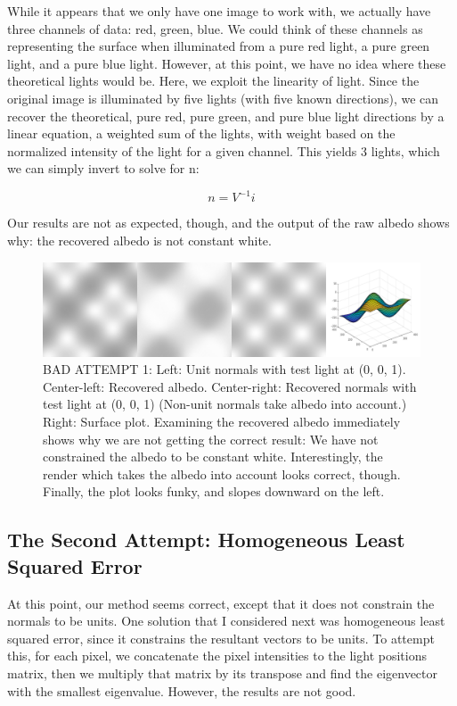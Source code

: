 \documentclass{article}
\begin{document}
While it appears that we only have one image to work with, we actually have 
three channels of data: red, green, blue. We could think of these channels as 
representing the surface when illuminated from a pure red light, a pure green 
light, and a pure blue light. However, at this point, we have no idea where 
these theoretical lights would be. Here, we exploit the linearity of light. 
Since the original image is illuminated by five lights (with five known 
directions), we can recover the theoretical, pure red, pure green, and pure blue 
light directions by a linear equation, a weighted sum of the lights, with 
weight based on the normalized intensity of the light for a given channel. This 
yields 3 lights, which we can simply invert to solve for n:

$$
n = V^{-1} i
$$

Our results are not as expected, though, and the output of the raw albedo shows 
why: the recovered albedo is not constant white.

\begin{figure}[!ht]
	\centering
	\includegraphics[width=160mm]{figs/q2_im2_bad1_all_figs.png}
	\caption{BAD ATTEMPT 1: Left: Unit normals with test light at (0, 0, 1). Center-left: 
        Recovered albedo. Center-right: Recovered normals with test light at (0, 
        0, 1) (Non-unit normals take albedo into account.) Right: Surface plot. 
        Examining the recovered albedo immediately shows why we are not getting 
        the correct result: We have not constrained the albedo to be constant 
        white. Interestingly, the render which takes the albedo into account 
        looks correct, though. Finally, the plot looks funky, and slopes 
        downward on the left.}
\end{figure}

\subsection{The Second Attempt: Homogeneous Least Squared Error}

At this point, our method seems correct, except that it does not constrain the 
normals to be units. One solution that I considered next was homogeneous least 
squared error, since it constrains the resultant vectors to be units. To attempt 
this, for each pixel, we concatenate the pixel intensities 
to the light positions matrix, then we multiply that matrix by its transpose and 
find the eigenvector with the smallest eigenvalue. However, the results are not 
good.
\end{document}
